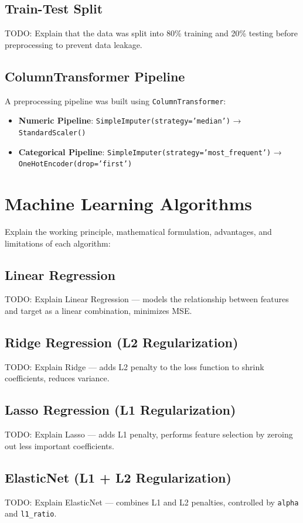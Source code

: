 \documentclass[12pt,a4paper]{article}
\begin{document}
\subsection{Train-Test Split}
TODO: Explain that the data was split into 80\% training and 20\% testing before preprocessing to prevent data leakage.

\subsection{ColumnTransformer Pipeline}
A preprocessing pipeline was built using \texttt{ColumnTransformer}:
\begin{itemize}
    \item \textbf{Numeric Pipeline}: \texttt{SimpleImputer(strategy='median')} → \texttt{StandardScaler()}
    \item \textbf{Categorical Pipeline}: \texttt{SimpleImputer(strategy='most\_frequent')} → \texttt{OneHotEncoder(drop='first')}
\end{itemize}

\section{Machine Learning Algorithms}
Explain the working principle, mathematical formulation, advantages, and limitations of each algorithm:

\subsection{Linear Regression}
TODO: Explain Linear Regression — models the relationship between features and target as a linear combination, minimizes MSE.

\subsection{Ridge Regression (L2 Regularization)}
TODO: Explain Ridge — adds L2 penalty to the loss function to shrink coefficients, reduces variance.

\subsection{Lasso Regression (L1 Regularization)}
TODO: Explain Lasso — adds L1 penalty, performs feature selection by zeroing out less important coefficients.

\subsection{ElasticNet (L1 + L2 Regularization)}
TODO: Explain ElasticNet — combines L1 and L2 penalties, controlled by \texttt{alpha} and \texttt{l1\_ratio}.
\end{document}
